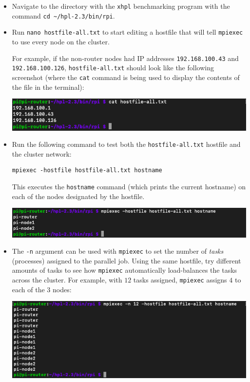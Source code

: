 \documentclass{article}
\newcommand{\tttilde}[0]{\textasciitilde{}}
\begin{document}
\begin{itemize}
    \item Navigate to the directory with the \texttt{xhpl} benchmarking program with the command \texttt{cd \tttilde/hpl-2.3/bin/rpi}.
    
    \item Run \texttt{nano hostfile-all.txt} to start editing a hostfile that will tell \texttt{mpiexec} to use every node on the cluster.
    
    For example, if the non-router nodes had IP addresses \texttt{192.168.100.43} and \texttt{192.168.100.126}, \texttt{hostfile-all.txt} should look like the following screenshot (where the \texttt{cat} command is being used to display the contents of the file in the terminal):
    
    \includegraphics[width=\textwidth]{images/hostfile-all.png}
    
    \item Run the following command to test both the \texttt{hostfile-all.txt} hostfile and the cluster network:
\begin{verbatim}
mpiexec -hostfile hostfile-all.txt hostname
\end{verbatim}
    This executes the \texttt{hostname} command (which prints the current hostname) on each of the nodes designated by the hostfile. 
    
    \includegraphics[width=\textwidth]{images/mpiexec-hostname.png}
    
    \item The \texttt{-n} argument can be used with \texttt{mpiexec} to set the number of \emph{tasks} (processes) assigned to the parallel job. Using the same hostfile, try different amounts of tasks to see how \texttt{mpiexec} automatically load-balances the tasks across the cluster. For example, with $12$ tasks assigned, \texttt{mpiexec} assigns $4$ to each of the $3$ nodes:
    
    \includegraphics[width=\textwidth]{images/hostfile-all-tasks.png}
\end{itemize}
\end{document}
